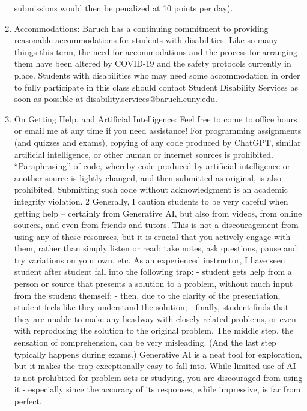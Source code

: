 \documentclass[a4paper]{article}
\begin{document}
\begin{enumerate}
    submissions would then be penalized at 10 points per day).
    \item Accommodations: Baruch has a continuing commitment to providing reasonable
    accommodations for students with disabilities. Like so many things this term, the need for
    accommodations and the process for arranging them have been altered by COVID-19 and the
    safety protocols currently in place. Students with disabilities who may need some
    accommodation in order to fully participate in this class should contact Student Disability
    Services as soon as possible at disability.services@baruch.cuny.edu.
    \item On Getting Help, and Artificial Intelligence: Feel free to come to office hours or email me at any
    time if you need assistance!
    For programming assignments (and quizzes and exams), copying of any code produced by
    ChatGPT, similar artificial intelligence, or other human or internet sources is prohibited.
    “Paraphrasing” of code, whereby code produced by artificial intelligence or another source is
    lightly changed, and then submitted as original, is also prohibited. Submitting such code
    without acknowledgment is an academic integrity violation.
    2
    Generally, I caution students to be very careful when getting help – certainly from Generative
    AI, but also from videos, from online sources, and even from friends and tutors. This is not a
    discouragement from using any of these resources, but it is crucial that you actively engage with
    them, rather than simply listen or read: take notes, ask questions, pause and try variations on
    your own, etc. As an experienced instructor, I have seen student after student fall into the
    following trap:
    - student gets help from a person or source that presents a solution to a problem, without much
    input from the student themself;
    - then, due to the clarity of the presentation, student feels like they understand the solution;
    - finally, student finds that they are unable to make any headway with closely-related problems,
    or even with reproducing the solution to the original problem.
    The middle step, the sensation of comprehension, can be very misleading. (And the last step
    typically happens during exams.)
    Generative AI is a neat tool for exploration, but it makes the trap exceptionally easy to fall into.
    While limited use of AI is not prohibited for problem sets or studying, you are discouraged from
    using it - especially since the accuracy of its responses, while impressive, is far from perfect.

\end{enumerate}
\end{document}
